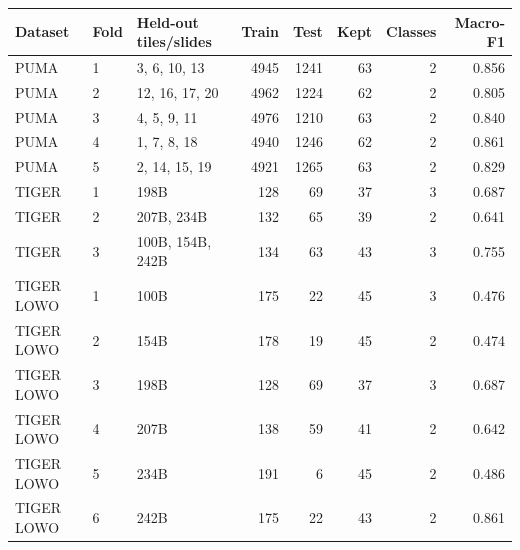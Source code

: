 \begin{tabular}{llp{3.8cm}rrrrr}
\toprule
Dataset & Fold & Held-out tiles/slides & Train & Test & Kept & Classes & Macro-F1 \\
\midrule
PUMA & 1 & 3, 6, 10, 13 & 4945 & 1241 & 63 & 2 & 0.856 \\
PUMA & 2 & 12, 16, 17, 20 & 4962 & 1224 & 62 & 2 & 0.805 \\
PUMA & 3 & 4, 5, 9, 11 & 4976 & 1210 & 63 & 2 & 0.840 \\
PUMA & 4 & 1, 7, 8, 18 & 4940 & 1246 & 62 & 2 & 0.861 \\
PUMA & 5 & 2, 14, 15, 19 & 4921 & 1265 & 63 & 2 & 0.829 \\
TIGER & 1 & 198B & 128 & 69 & 37 & 3 & 0.687 \\
TIGER & 2 & 207B, 234B & 132 & 65 & 39 & 2 & 0.641 \\
TIGER & 3 & 100B, 154B, 242B & 134 & 63 & 43 & 3 & 0.755 \\
TIGER LOWO & 1 & 100B & 175 & 22 & 45 & 3 & 0.476 \\
TIGER LOWO & 2 & 154B & 178 & 19 & 45 & 2 & 0.474 \\
TIGER LOWO & 3 & 198B & 128 & 69 & 37 & 3 & 0.687 \\
TIGER LOWO & 4 & 207B & 138 & 59 & 41 & 2 & 0.642 \\
TIGER LOWO & 5 & 234B & 191 & 6 & 45 & 2 & 0.486 \\
TIGER LOWO & 6 & 242B & 175 & 22 & 43 & 2 & 0.861 \\
\bottomrule
\end{tabular}
